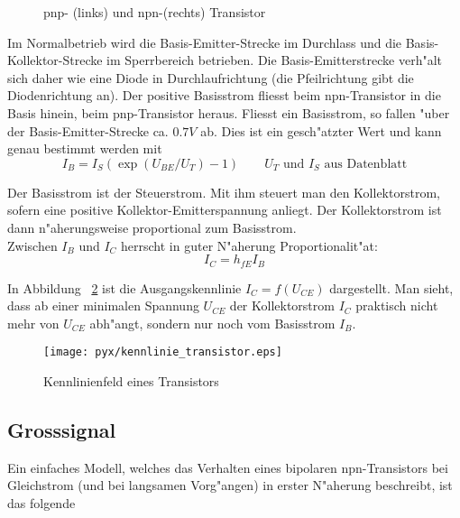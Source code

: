 \documentclass[german, 10pt, a4paper, headsepline]{scrreprt}
\theoremstyle{remark}
\begin{document}
\begin{figure}[hbt]
 
 \centerline{\box\graph}
 \caption{pnp- (links) und npn-(rechts) Transistor}
 \label{transistor}
\end{figure}

Im Normalbetrieb wird die Basis-Emitter-Strecke im Durchlass und die Basis-Kollektor-Strecke im Sperrbereich betrieben. Die Basis-Emitterstrecke verh"alt sich daher wie eine Diode in Durchlaufrichtung (die Pfeilrichtung gibt die Diodenrichtung an). Der positive Basisstrom fliesst beim npn-Transistor in die Basis hinein, beim pnp-Transistor heraus. Fliesst ein Basisstrom, so fallen "uber der Basis-Emitter-Strecke ca. $0.7V$ ab. Dies ist ein gesch"atzter Wert und kann genau bestimmt werden mit
\begin{displaymath}
	I_B = I_S(\exp(U_{BE}/U_T) -1) \qquad U_T \text{ und } I_S \text{ aus Datenblatt}
\end{displaymath}

Der Basisstrom ist der Steuerstrom. Mit ihm steuert man den Kollektorstrom, sofern eine positive Kollektor-Emitterspannung anliegt. Der Kollektorstrom ist dann n"aher\-ungs\-weise proportional zum Basisstrom.\\

Zwischen $I_B$ und $I_C$ herrscht in guter N"aherung Proportionalit"at:
\begin{displaymath}
	I_C = h_{fE} I_B
\end{displaymath}

In Abbildung ~\ref{ausgangskennlinie_transistor} ist die Ausgangskennlinie $I_C = f(U_{CE})$ dargestellt. Man sieht, dass ab einer minimalen Spannung $U_{CE}$ der Kollektorstrom $I_C$ praktisch nicht mehr von $U_{CE}$ abh"angt, sondern nur noch vom Basisstrom $I_B$.

\begin{figure}[hbt]
 \begin{center}
 	\texttt{[image: pyx/kennlinie\_transistor.eps]}
 \end{center}
 \caption{Kennlinienfeld eines Transistors}
 \label{ausgangskennlinie_transistor}
\end{figure}

\subsection{Grosssignal}

Ein einfaches Modell, welches das Verhalten eines bipolaren npn-Transistors bei Gleichstrom (und bei langsamen Vorg"angen) in erster N"aherung beschreibt, ist das folgende
\end{document}
